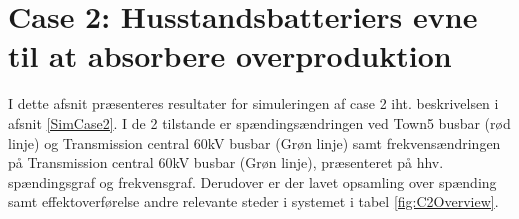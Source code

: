 

\label{ResultatOgDiskussion2}

\section{Case 2: Husstandsbatteriers evne til at absorbere overproduktion}
I dette afsnit præsenteres resultater for simuleringen af case 2 iht. beskrivelsen i afsnit \ref{SimCase2}. I de 2 tilstande er spændingsændringen ved Town5 busbar (rød linje) og Transmission central 60kV busbar (Grøn linje) samt frekvensændringen på Transmission central 60kV busbar (Grøn linje), præsenteret på hhv. spændingsgraf og frekvensgraf. Derudover er der lavet opsamling over spænding samt effektoverførelse andre relevante steder i systemet i tabel \ref{fig:C2Overview}. \\ \\

